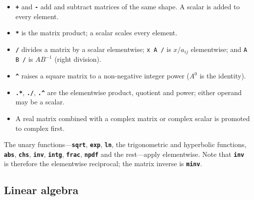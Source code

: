 \documentclass[11pt,letterpaper]{article}
\newcommand{\code}[1]{\texttt{#1}}
\newcommand{\cmd}[1]{\texttt{\textbf{#1}}}
\begin{document}
\begin{itemize}
  \item \cmd{+} and \cmd{-} add and subtract matrices of the same shape. A scalar is added to every element.
  \item \cmd{*} is the matrix product; a scalar scales every element.
  \item \cmd{/} divides a matrix by a scalar elementwise; \code{x A /} is $x/a_{ij}$ elementwise; and \code{A B /} is $A B^{-1}$ (right division).
  \item \cmd{\textasciicircum} raises a square matrix to a non-negative integer power ($A^0$ is the identity).
  \item \cmd{.*}, \cmd{./}, \cmd{.\textasciicircum} are the elementwise product, quotient and power; either operand may be a scalar.
  \item A real matrix combined with a complex matrix or complex scalar is promoted to complex first.
\end{itemize}

The unary functions---\cmd{sqrt}, \cmd{exp}, \cmd{ln}, the trigonometric and hyperbolic functions, \cmd{abs}, \cmd{chs}, \cmd{inv}, \cmd{intg}, \cmd{frac}, \cmd{npdf} and the rest---apply elementwise. Note that \cmd{inv} is therefore the elementwise reciprocal; the matrix inverse is \cmd{minv}.

\subsection{Linear algebra}
\end{document}
